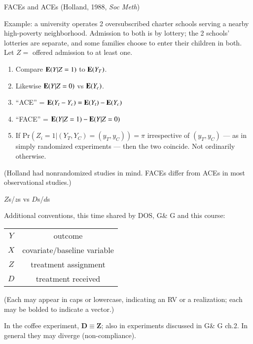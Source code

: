 \begin{frame}{FACEs and ACEs (Holland, 1988, \textit{Soc Meth}) }

Example: a university operates 2 oversubscribed charter schools
serving a nearby high-poverty neighborhood. Admission to both is by
lottery; the 2 schools' lotteries are separate, and some families
choose to enter their children in 
both. Let $Z=$ offered admission to at least one.

  \begin{enumerate}[<+->]
  \item   Compare $\mathbf{E}(Y | Z=1)$ to $\mathbf{E}(Y_{T})$.  
\item Likewise  $\mathbf{E}(Y | Z=0)$ vs $\mathbf{E}(Y_{c})$.
\item ``ACE'' = $\mathbf{E}(Y_t - Y_c) = \mathbf{E}(Y_{t}) - \mathbf{E}(Y_{c})$
\item ``FACE'' = $\mathbf{E}(Y | Z=1) - \mathbf{E}(Y | Z=0)$
\item If $\mathrm{Pr}(Z_{i}=1 | (Y_{T}, Y_{C})=(y_{T}, y_{C})) = \pi$
  irrespective of $(y_{T}, y_{C}) $ --- as in simply randomized
  experiments --- then the two coincide.  
Not ordinarily otherwise.
  \end{enumerate}

\pause

(Holland  had nonrandomized studies in mind.  FACEs differ from ACEs
in most observational studies.)

\end{frame}


\begin{frame}{$Z$s/$z$s vs $D$s/$d$s}
  
Additional conventions, this time shared by DOS, G\& G and this course:

\begin{tabular}{cc}
  $Y$ & outcome \\
  $X$ & covariate/baseline variable\\
  $Z$ & treatment assignment\\
  $D$ & treatment received \\
\end{tabular}
\pause

(Each may appear in caps or lowercase, indicating an RV or a realization; each may be bolded to indicate a vector.) \pause

In the coffee experiment, $\mathbf{D} \equiv \mathbf{Z}$; also in experiments discussed in G\& G ch.2.  In general they may diverge (non-compliance). 

\end{frame}


